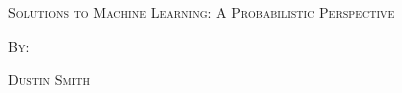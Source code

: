 \documentclass[dvipsnames,svgnames,x11names]{scrbook}%
\begin{document}
%
\pagecolor{PaleGreen1}
\begin{center}
  \begin{center}
  \vspace*{\fill}
  \textsc{\LARGE Solutions to Machine Learning: A Probabilistic Perspective}
  \par\bigskip
  \textsc{By:}
  \par\bigskip
  \textsc{\LARGE Dustin Smith}
  \vspace*{\fill}
\end{center}
\end{center}

\newpage

\tableofcontents

\newpage



\end{document}
